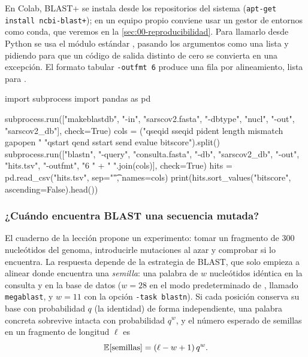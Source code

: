 En Colab, BLAST+ se instala desde los repositorios del sistema (\texttt{apt-get install ncbi-blast+}); en un equipo propio conviene usar un gestor de entornos como conda, que veremos en la \cref{sec:00-reproducibilidad}. Para llamarlo desde Python se usa el módulo estándar , pasando los argumentos como una lista y pidiendo  para que un código de salida distinto de cero se convierta en una excepción. El formato tabular \texttt{-outfmt 6} produce una fila por alineamiento, lista para .

\begin{codigo}
import subprocess
import pandas as pd

subprocess.run(["makeblastdb", "-in", "sarscov2.fasta",
                "-dbtype", "nucl", "-out", "sarscov2_db"], check=True)
cols = ("qseqid sseqid pident length mismatch gapopen "
        "qstart qend sstart send evalue bitscore").split()
subprocess.run(["blastn", "-query", "consulta.fasta",
                "-db", "sarscov2_db", "-out", "hits.tsv",
                "-outfmt", "6 " + " ".join(cols)], check=True)
hits = pd.read_csv("hits.tsv", sep="\t", names=cols)
print(hits.sort_values("bitscore", ascending=False).head())
\end{codigo}

\subsubsection{¿Cuándo encuentra BLAST una secuencia mutada?}

El cuaderno de la lección propone un experimento: tomar un fragmento de 300 nucleótidos del genoma, introducirle mutaciones al azar y comprobar si  lo encuentra. La respuesta depende de la estrategia de BLAST, que solo empieza a alinear donde encuentra una \emph{semilla}: una palabra de $w$ nucleótidos idéntica en la consulta y en la base de datos ($w=28$ en el modo predeterminado de , llamado \texttt{megablast}, y $w=11$ con la opción \texttt{-task blastn}). Si cada posición conserva su base con probabilidad $q$ (la identidad) de forma independiente, una palabra concreta sobrevive intacta con probabilidad $q^w$, y el número esperado de semillas en un fragmento de longitud $\ell$ es
\begin{equation}\label{eq:00-semillas}
\mathbb{E}[\text{semillas}] = (\ell - w + 1)\,q^{w}.
\end{equation}

\begin{simbolos}
\end{simbolos}

